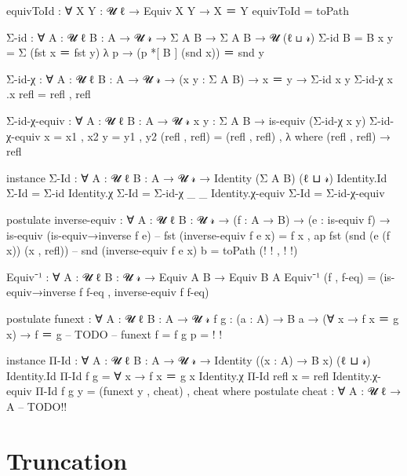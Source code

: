 \begin{code}
equivToId : ∀  {X Y : 𝓤 ℓ} → Equiv X Y → X ＝ Y
equivToId = toPath

Σ-id : ∀ {A : 𝓤 ℓ} {B : A → 𝓤 𝓇} → Σ A B → Σ A B → 𝓤 (ℓ ⊔ 𝓇)
Σ-id {B = B} x y = Σ (fst x ＝ fst y) λ p → (p *[ B ] (snd x)) ＝ snd y

Σ-id-χ : ∀ {A : 𝓤 ℓ} {B : A → 𝓤 𝓇} → (x y : Σ A B) → x ＝ y → Σ-id x y
Σ-id-χ x .x refl = refl , refl

Σ-id-χ-equiv : ∀ {A : 𝓤 ℓ} {B : A → 𝓤 𝓇} {x y : Σ A B} → is-equiv (Σ-id-χ x y)
Σ-id-χ-equiv {x = x1 , x2} {y = y1 , y2} (refl , refl) = (refl , refl) , λ where (refl , refl) → refl


instance
    Σ-Id : ∀ {A : 𝓤 ℓ} {B : A → 𝓤 𝓇} → Identity (Σ A B) (ℓ ⊔ 𝓇)
    Identity.Id Σ-Id = Σ-id
    Identity.χ Σ-Id = Σ-id-χ _ _
    Identity.χ-equiv Σ-Id = Σ-id-χ-equiv

postulate
    inverse-equiv : ∀ {A : 𝓤 ℓ} {B : 𝓤 𝓇} → (f : A → B) → (e : is-equiv f) → is-equiv (is-equiv→inverse f e)
-- fst (inverse-equiv f e x) = f x , ap fst (snd (e (f x)) (x , refl))
-- snd (inverse-equiv f e x) b = toPath ({!   !} , {!   !})

Equiv⁻¹ : ∀ {A : 𝓤 ℓ} {B : 𝓤 𝓇} → Equiv A B → Equiv B A
Equiv⁻¹ (f , f-eq) = (is-equiv→inverse f f-eq , inverse-equiv f f-eq)
    
postulate funext : ∀ {A : 𝓤 ℓ} {B : A → 𝓤 𝓇} {f g : (a : A) → B a} → (∀ x → f x ＝ g x) → f ＝ g -- TODO
-- funext {f = f} {g} p = {!    !}

instance
    Π-Id : ∀ {A : 𝓤 ℓ} {B : A → 𝓤 𝓇} → Identity ((x : A) → B x) (ℓ ⊔ 𝓇)
    Identity.Id Π-Id f g = ∀ x → f x ＝ g x
    Identity.χ Π-Id refl x = refl
    Identity.χ-equiv Π-Id {f} {g} y = (funext y , cheat) , cheat  where
        postulate cheat : ∀ {A : 𝓤 ℓ} → A -- TODO!!



\end{code}  

\section{Truncation}

